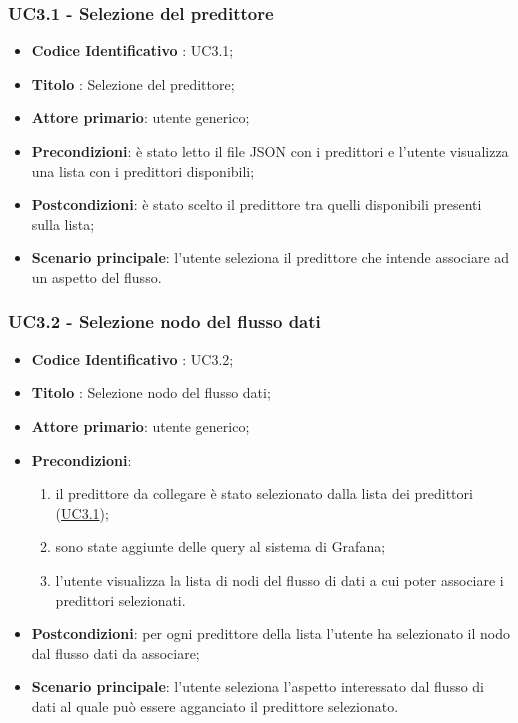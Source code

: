 \begin{itemize}
\begin{enumerate}
				\end{enumerate}
		\end{itemize}
		

		\label{par:UC3.1}
		\subsubsection{UC3.1 - Selezione del predittore}
		\begin{itemize}
			\item\textbf{Codice Identificativo} : UC3.1;
			\item\textbf{Titolo} : Selezione del predittore;
			\item\textbf{Attore primario}: utente generico;
			\item\textbf{Precondizioni}: è stato letto il file JSON con i predittori e l'utente visualizza una lista con i predittori disponibili;
			\item\textbf{Postcondizioni}: è stato scelto il predittore tra quelli disponibili presenti sulla lista;
			\item\textbf{Scenario principale}: l'utente seleziona il predittore che intende associare ad un aspetto del flusso.
		\end{itemize}
		
	
	\label{par:UC3.2}
	\subsubsection{UC3.2 - Selezione nodo del flusso dati}
		\begin{itemize}
			\item\textbf{Codice Identificativo} : UC3.2;
			\item\textbf{Titolo} : Selezione nodo del flusso dati;
			\item\textbf{Attore primario}: utente generico;
			\item\textbf{Precondizioni}:
				\begin{enumerate}
					\item il predittore da collegare è stato selezionato dalla lista dei predittori (\hyperref[par:UC3.1]{UC3.1});
					\item sono state aggiunte delle query al sistema di Grafana;
					\item l'utente visualizza la lista di nodi del flusso di dati a cui poter associare i predittori selezionati.
				\end{enumerate}
			\item\textbf{Postcondizioni}: per ogni predittore della lista l'utente ha selezionato il nodo dal flusso dati da associare;
		
			\item\textbf{Scenario principale}: l'utente seleziona l'aspetto interessato dal flusso di dati al quale può essere agganciato il predittore selezionato.
		\end{itemize}

